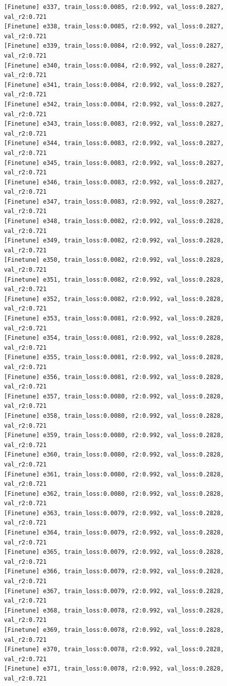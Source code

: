 \documentclass[a4paper, 12pt]{article}
\begin{document}
\begin{lstlisting}
[Finetune] e337, train_loss:0.0085, r2:0.992, val_loss:0.2827, val_r2:0.721
[Finetune] e338, train_loss:0.0085, r2:0.992, val_loss:0.2827, val_r2:0.721
[Finetune] e339, train_loss:0.0084, r2:0.992, val_loss:0.2827, val_r2:0.721
[Finetune] e340, train_loss:0.0084, r2:0.992, val_loss:0.2827, val_r2:0.721
[Finetune] e341, train_loss:0.0084, r2:0.992, val_loss:0.2827, val_r2:0.721
[Finetune] e342, train_loss:0.0084, r2:0.992, val_loss:0.2827, val_r2:0.721
[Finetune] e343, train_loss:0.0083, r2:0.992, val_loss:0.2827, val_r2:0.721
[Finetune] e344, train_loss:0.0083, r2:0.992, val_loss:0.2827, val_r2:0.721
[Finetune] e345, train_loss:0.0083, r2:0.992, val_loss:0.2827, val_r2:0.721
[Finetune] e346, train_loss:0.0083, r2:0.992, val_loss:0.2827, val_r2:0.721
[Finetune] e347, train_loss:0.0083, r2:0.992, val_loss:0.2827, val_r2:0.721
[Finetune] e348, train_loss:0.0082, r2:0.992, val_loss:0.2828, val_r2:0.721
[Finetune] e349, train_loss:0.0082, r2:0.992, val_loss:0.2828, val_r2:0.721
[Finetune] e350, train_loss:0.0082, r2:0.992, val_loss:0.2828, val_r2:0.721
[Finetune] e351, train_loss:0.0082, r2:0.992, val_loss:0.2828, val_r2:0.721
[Finetune] e352, train_loss:0.0082, r2:0.992, val_loss:0.2828, val_r2:0.721
[Finetune] e353, train_loss:0.0081, r2:0.992, val_loss:0.2828, val_r2:0.721
[Finetune] e354, train_loss:0.0081, r2:0.992, val_loss:0.2828, val_r2:0.721
[Finetune] e355, train_loss:0.0081, r2:0.992, val_loss:0.2828, val_r2:0.721
[Finetune] e356, train_loss:0.0081, r2:0.992, val_loss:0.2828, val_r2:0.721
[Finetune] e357, train_loss:0.0080, r2:0.992, val_loss:0.2828, val_r2:0.721
[Finetune] e358, train_loss:0.0080, r2:0.992, val_loss:0.2828, val_r2:0.721
[Finetune] e359, train_loss:0.0080, r2:0.992, val_loss:0.2828, val_r2:0.721
[Finetune] e360, train_loss:0.0080, r2:0.992, val_loss:0.2828, val_r2:0.721
[Finetune] e361, train_loss:0.0080, r2:0.992, val_loss:0.2828, val_r2:0.721
[Finetune] e362, train_loss:0.0080, r2:0.992, val_loss:0.2828, val_r2:0.721
[Finetune] e363, train_loss:0.0079, r2:0.992, val_loss:0.2828, val_r2:0.721
[Finetune] e364, train_loss:0.0079, r2:0.992, val_loss:0.2828, val_r2:0.721
[Finetune] e365, train_loss:0.0079, r2:0.992, val_loss:0.2828, val_r2:0.721
[Finetune] e366, train_loss:0.0079, r2:0.992, val_loss:0.2828, val_r2:0.721
[Finetune] e367, train_loss:0.0079, r2:0.992, val_loss:0.2828, val_r2:0.721
[Finetune] e368, train_loss:0.0078, r2:0.992, val_loss:0.2828, val_r2:0.721
[Finetune] e369, train_loss:0.0078, r2:0.992, val_loss:0.2828, val_r2:0.721
[Finetune] e370, train_loss:0.0078, r2:0.992, val_loss:0.2828, val_r2:0.721
[Finetune] e371, train_loss:0.0078, r2:0.992, val_loss:0.2828, val_r2:0.721

\end{lstlisting}
\end{document}
